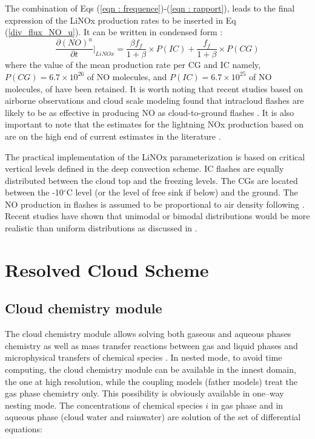 The combination of Eqs (\ref{eqn : frequence})-(\ref{eqn : rapport}), leads to
the final expression of the LiNOx production rates to be inserted in
Eq (\ref{div_flux_NO_u}). It can be written in condensed form :
\begin{equation}\label{LiNOx_rate_ud}
{\frac {\partial (NO)^{u}}{\partial t}} \bigg\vert_{LiNOx} = \frac{\beta f_f}{1+\beta}\times P(IC) + \frac{f_f}{1+\beta}\times P(CG)
\end{equation}
where the value of the mean production rate per CG and IC namely, 
$P(CG) = 6.7\times 10^{26}$ of NO molecules, and 
$P(IC) = 6.7\times 10^{25}$ of NO molecules, of
\citet{Price1997} have been retained. 
It is worth noting that recent studies based on airborne observations and 
cloud scale modeling found that intracloud flashes are likely to be as 
effective 
in producing NO as cloud-to-ground flashes 
\citep{DeCaria2000,Fehr2004,Ridley2005}. 
It is also important to note that the estimates for the lightning 
NOx production based on \citet{Price1992,Price1994,Price1997}
are on the high end of current estimates in the  literature
\citep{Labrador2005}. 

The practical implementation of the LiNOx parameterization is based on critical 
vertical levels defined in the deep convection scheme. IC flashes are equally 
distributed between the cloud top and the freezing levels. The CGs are located 
between the -10$^{\circ}$C level (or the level of free sink if below) and the 
ground. The NO production in flashes 
is assumed to be proportional to air density following 
\citet{Goldenbaum1993}. 
Recent studies have shown that unimodal or bimodal distributions would be more 
realistic than uniform distributions as discussed in 
\citet{MacGorman1998,DeCaria2000,DeCaria2005}. 

\section{Resolved Cloud Scheme}
 \subsection{Cloud chemistry module}
The cloud chemistry module allows solving both gaseous and aqueous phases chemistry 
as well as mass transfer reactions between gas and liquid phases and microphysical 
transfers of chemical species \citep{Leriche2013}. In nested mode, to avoid time computing, 
the cloud chemistry module can be available in the innest domain, the one at high resolution, 
while the coupling models (father models) treat the gas phase chemistry only. This possibility 
is obviously available in one--way nesting mode. The concentrations of chemical species $i$ 
in gas phase and in aqueous phase (cloud water and rainwater) are solution of 
the set of differential equations:

